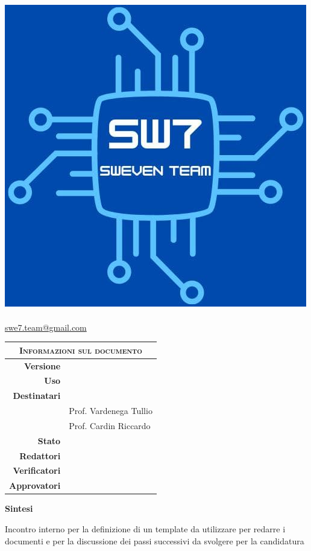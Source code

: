 \documentclass[12pt, a4paper,table]{article}
\title{\textsc{\docNome} \\ \textsc{\docNomeProgetto}}
\author{}
\date{}
\begin{document}
	\maketitle
	\vspace{-3em}
	\begin{center}
	\includegraphics[scale=0.50]{images/logo.jpg} \\
	\vspace{2em}
	\huge \textsc{\docNomeTeam}\\
	\normalsize \href{mailto:swe7.team@gmail.com}{swe7.team@gmail.com}\\
	\vspace{2em}
	\begin{tabular}{r|l}
		\multicolumn{2}{c}{ \textsc{Informazioni sul documento} } \\
		\hline
		\textbf{Versione}     & \docVersione\\
		\textbf{Uso}          & \docUso\\
		\textbf{Destinatari}  & \docDestinatari\\
		& Prof. Vardenega Tullio\\
		& Prof. Cardin Riccardo\\
		\textbf{Stato}        & \docStatus\\
		\textbf{Redattori}    & \docRedattori\\
		\textbf{Verificatori} & \docVerificatori\\
		\textbf{Approvatori} & \docApprovazione\\
	\end{tabular}
	\end{center}
	\vspace{3em}
    \begin{center}
        \LARGE{\textbf{Sintesi}} 
    \end{center}
    \normalsize{Incontro interno per la definizione di un template da utilizzare per redarre i documenti e per la discussione dei passi successivi da svolgere per la candidatura}
	\thispagestyle{empty}   
	\newpage
	
\end{document}
